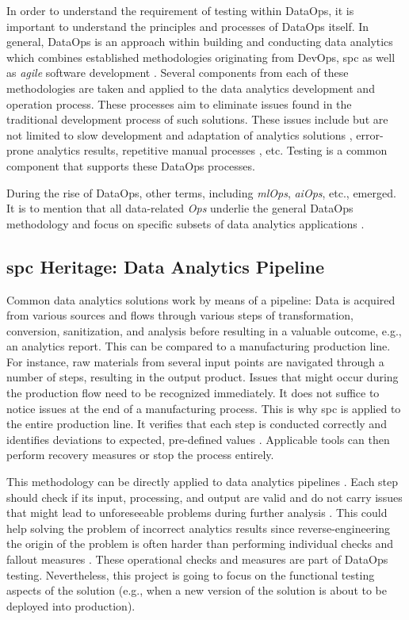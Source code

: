 In order to understand the requirement of testing within DataOps, it is important to understand the principles and processes of DataOps itself. In general, DataOps is an approach within building and conducting data analytics which combines established methodologies originating from DevOps, \ac{spc} as well as \textit{agile} software development \cite[24]{Bergh2019}. Several components from each of these methodologies are taken and applied to the data analytics development and operation process. These processes aim to eliminate issues found in the traditional development process of such solutions. These issues include but are not limited to slow development and adaptation of analytics solutions \cite{Lockner2019}, error-prone analytics results, repetitive manual processes \cite[11\psqq]{Bergh2019}, etc. Testing is a common component that supports these DataOps processes.

During the rise of DataOps, other terms, including \textit{\acs{ml}Ops}, \textit{\acs{ai}Ops}, etc., emerged. It is to mention that all data-related \textit{Ops} underlie the general DataOps methodology and focus on specific subsets of data analytics applications \cite{Aslett2018}.

\subsection{\acs{spc} Heritage: Data Analytics Pipeline}
Common data analytics solutions work by means of a pipeline: Data is acquired from various sources and flows through various steps of transformation, conversion, sanitization, and analysis before resulting in a valuable outcome, e.g., an analytics report. This can be compared to a manufacturing production line. For instance, raw materials from several input points are navigated through a number of steps, resulting in the output product. Issues that might occur during the production flow need to be recognized immediately. It does not suffice to notice issues at the end of a manufacturing process. This is why \acf{spc} is applied to the entire production line. It verifies that each step is conducted correctly and identifies deviations to expected, pre-defined values \cite[1]{Knoth2002}. Applicable tools can then perform recovery measures or stop the process entirely.

This methodology can be directly applied to data analytics pipelines \cite[27]{Bergh2019}. Each step should check if its input, processing, and output are valid and do not carry issues that might lead to unforeseeable problems during further analysis \cite{DataKitchen2020a}. This could help solving the problem of incorrect analytics results since reverse-engineering the origin of the problem is often harder than performing individual checks and fallout measures \cite{Redman2020}. These operational checks and measures are part of DataOps testing. Nevertheless, this project is going to focus on the functional testing aspects of the solution (e.g., when a new version of the solution is about to be deployed into production).

